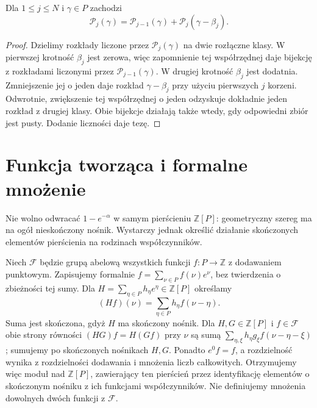 \begin{lemat}
\label{aa:lem:kostant-partition-recursion}
Dla $1\le j\le N$ i $\gamma\in P$ zachodzi
\[
 \mathcal P_j(\gamma)=
 \mathcal P_{j-1}(\gamma)+\mathcal P_j(\gamma-\beta_j).
\]
\end{lemat}
\begin{proof}
Dzielimy rozkłady liczone przez $\mathcal P_j(\gamma)$ na dwie rozłączne klasy. W pierwszej krotność $\beta_j$ jest zerowa, więc zapomnienie tej współrzędnej daje bijekcję z rozkładami liczonymi przez $\mathcal P_{j-1}(\gamma)$. W drugiej krotność $\beta_j$ jest dodatnia. Zmniejszenie jej o jeden daje rozkład $\gamma-\beta_j$ przy użyciu pierwszych $j$ korzeni. Odwrotnie, zwiększenie tej współrzędnej o jeden odzyskuje dokładnie jeden rozkład z drugiej klasy. Obie bijekcje działają także wtedy, gdy odpowiedni zbiór jest pusty. Dodanie liczności daje tezę.
\end{proof}

\section{Funkcja tworząca i formalne mnożenie}

Nie wolno odwracać $1-e^{-\alpha}$ w samym pierścieniu $\mathbb Z[P]$: geometryczny szereg ma na ogół nieskończony nośnik. Wystarczy jednak określić działanie skończonych elementów pierścienia na rodzinach współczynników.

Niech $\mathcal F$ będzie grupą abelową wszystkich funkcji $f:P\to\mathbb Z$ z dodawaniem punktowym. Zapisujemy formalnie $f=\sum_{\nu\in P}f(\nu)e^\nu$, bez twierdzenia o zbieżności tej sumy. Dla $H=\sum_{\eta\in P}h_\eta e^\eta\in\mathbb Z[P]$ określamy
\[
 (Hf)(\nu)=\sum_{\eta\in P}h_\eta f(\nu-\eta).
\]
Suma jest skończona, gdyż $H$ ma skończony nośnik. Dla $H,G\in\mathbb Z[P]$ i $f\in\mathcal F$ obie strony równości $(HG)f=H(Gf)$ przy $\nu$ są sumą
$\sum_{\eta,\xi}h_\eta g_\xi f(\nu-\eta-\xi)$;
sumujemy po skończonych nośnikach $H,G$. Ponadto $e^0f=f$, a rozdzielność wynika z rozdzielności dodawania i mnożenia liczb całkowitych. Otrzymujemy więc moduł nad $\mathbb Z[P]$, zawierający ten pierścień przez identyfikację elementów o skończonym nośniku z ich funkcjami współczynników. Nie definiujemy mnożenia dowolnych dwóch funkcji z $\mathcal F$.

